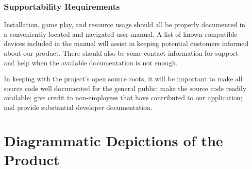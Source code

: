 \documentclass[12pt]{article}
\begin{document}
\subsubsection{Supportability Requirements}
Installation, game play, and resource usage should all be properly 
documented in a conveniently located and navigated user-manual. A list of 
known compatible devices included in the manual will assist in keeping 
potential customers informed about our product.  There should also be some 
contact information for support and help when the available documentation 
is not enough.

In keeping with the project's open source roots, it will be important to 
make all source code well documented for the general public; make the 
source code readily available; give credit to non-employees that have 
contributed to our application; and provide substantial developer 
documentation. 




\section{Diagrammatic Depictions of the Product}
\label{sec:diagrams}


\end{document}
